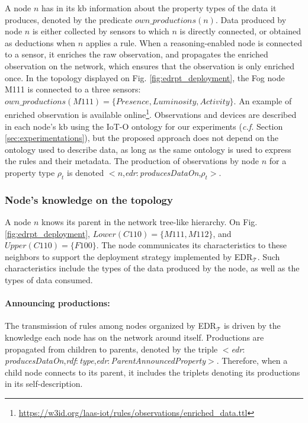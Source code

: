 \documentclass{iosart2c}
\newcommand{\edrt}{EDR$_{\mathcal{T}}$\xspace}
\newcommand{\namespace}[1]{\textit{#1$:$}}
\newcommand{\concept}[2]{\namespace{#1}\-\textit{#2}}
\newcommand{\triplet}[3]{$<$#1,\textit{#2},#3$>$}
\begin{document}
A node $n$ has in its \gls{kb} information about the property types of the data it produces, denoted by the predicate $own\_productions(n)$.
Data produced by node $n$ is either collected by sensors to which $n$ is directly connected, or obtained as deductions when $n$ applies a rule.
When a reasoning-enabled node is connected to a sensor, it enriches the raw observation, and propagates the enriched observation on the network, which ensures that the observation is only enriched once. 
In the topology displayed on Fig. \ref{fig:edrpt_deployment}, the Fog node M111 is connected to a three sensors: $own\_productions(M111) = \{Presence, Luminosity, Activity\}$.
An example of enriched observation is available online\footnote{\url{https://w3id.org/laas-iot/rules/observations/enriched_data.ttl}}.
Observations and devices are described in each node's \gls{kb} using the IoT-O\cite{Seydoux2016} ontology for our experiments (\textit{c.f.} Section \textsection \ref{sec:experimentations}), but the proposed approach does not depend on the ontology used to describe data, as long as the same ontology is used to express the rules and their metadata. 
The production of observations by node $n$ for a property type $\rho_t$ is denoted \triplet{$n$}{\concept{edr}{produces\-Data\-On}}{$\rho_t$}. 

\subsubsection{Node's knowledge on the topology}
\label{subsub:topology}

A node $n$ knows its parent in the network tree-like hierarchy. 
On Fig. \ref{fig:edrpt_deployment}, $Lower(C110)=\{M111, M112\}$, and $Upper(C110)=\{F100\}$.
The node communicates its characteristics to these neighbors to support the deployment strategy implemented by \edrt.
Such characteristics include the types of the data produced by the node, as well as the types of data consumed.

\paragraph{Announcing productions:}
The transmission of rules among nodes organized by \edrt is driven by the knowledge each node has on the network around itself.
Productions are propagated from children to parents, denoted by the triple \triplet{\concept{edr}{produces\-Data\-On}}{\concept{rdf}{type}}{\concept{edr}{Parent\-Announced\-Property}}. 
Therefore, when a child node connects to its parent, it includes the triplets denoting its productions in its self-description. 
\end{document}
